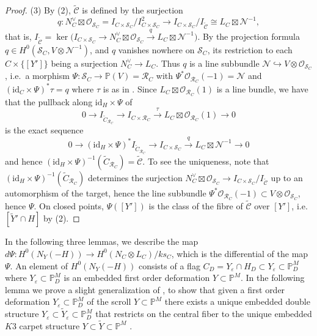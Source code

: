 \documentclass[11pt,twoside]{amsart}
\theoremstyle{plain}
\theoremstyle{definition}
\newcommand{\PP}{\mathbb{P}}
\newcommand{\OO}{\mathcal{O}}
\newcommand{\id}{\mathrm{id}}
\newcommand{\Yt}{\widetilde{Y}}
\newcommand{\Ct}{\widetilde{C}}
\newcommand{\SC}{\mathcal{S}_C}
\newcommand{\RC}{\mathcal{R}_C}
\newcommand{\cCt}{\widetilde{\mathcal{C}}}
\newcommand{\cN}{\mathcal{N}}
\begin{document}
\begin{proof}
(3) By (2), $\cCt$ is defined by the surjection
\[
q\colon N_C^{\vee}\boxtimes\OO_{\SC}=I_{C\times\SC}/I_{C\times\SC}^2\longrightarrow I_{C\times\SC}/I_{\cCt}\cong L_C\boxtimes\cN^{-1},
\]
that is, $I_{\cCt}=\ker\big(I_{C\times\SC}\to N_C^{\vee}\boxtimes\OO_{\SC}\xrightarrow{\ q\ }L_C\boxtimes\cN^{-1}\big)$.
By the projection formula $q\in H^0(\SC,V\otimes\cN^{-1})$, and $q$ vanishes nowhere on $\SC$, its restriction to each $C\times\{[Y']\}$ being a surjection $N_C^{\vee}\to L_C$. Thus $q$ is a line subbundle $\cN\hookrightarrow V\otimes\OO_{\SC}$, i.e.\ a morphism $\Psi\colon\SC\to\PP(V)=\RC$ with $\Psi^*\OO_{\RC}(-1)=\cN$ and $(\id_C\times\Psi)^*\tau=q$ where $\tau$ is as in . Since $L_C\boxtimes\OO_{\RC}(1)$ is a line bundle, we have that the pullback along $\id_H\times\Psi$  of $$0\to I_{\Ct_{\RC}}\to I_{C\times\RC}\xrightarrow{\tau} L_C\boxtimes\OO_{\RC}(1)\to0$$ is the exact sequence $$0\to(\id_H\times\Psi)^*I_{\Ct_{\RC}}\to I_{C\times\SC}\xrightarrow{q}L_C\boxtimes\cN^{-1}\to0$$ and hence $(\id_H\times\Psi)^{-1}(\Ct_{\RC})=\cCt$. To see the uniqueness, note that $(\id_H\times\Psi)^{-1}(\Ct_{\RC})$ determines the surjection $N_C^{\vee}\boxtimes\OO_{\SC}\to I_{C\times\SC}/I_{\cCt}$ up to an automorphism of the target, hence the line subbundle $\Psi^*\OO_{\RC}(-1)\subset V\otimes\OO_{\SC}$, hence $\Psi$. On closed points, $\Psi([Y'])$ is the class of the fibre of $\cCt$ over $[Y']$, i.e.\ $[\Yt'\cap H]$ by (2).
\end{proof}





In the following three lemmas, we describe the map $d\Psi: H^0(N_Y(-H)) \to H^0(N_C \otimes L_C)/ks_C$, which is the differential of the map $\Psi$. An element of $H^0(N_Y(-H))$ consists of a flag $C_D = Y_{\varepsilon} \cap H_D \subset Y_{\varepsilon} \subset \mathbb{P}_D^M$ where $Y_{\varepsilon} \subset \mathbb{P}_D^M$ is an embedded first order deformation $Y \subset \mathbb{P}^M$. In the following lemma we prove a slight generalization of \cite[Prop.~3.7]{GP97}, to show that given a first order deformation $Y_{\varepsilon} \subset \mathbb{P}_D^M$ of the scroll $Y \subset \mathbb{P}^M$ there exists a unique embedded double structure $Y_{\varepsilon} \subset \widetilde Y_{\varepsilon} \subset \mathbb{P}_D^M$  that restricts on the central fiber to the unique embedded $K3$ carpet structure $Y \subset \widetilde Y \subset \mathbb{P}^M$ .
\end{document}
